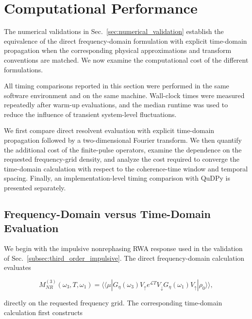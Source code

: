 \documentclass[11pt]{article}
\begin{document}
\section{Computational Performance}
\label{sec:computational_performance}

The numerical validations in Sec.~\ref{sec:numerical_validation}
establish the equivalence of the direct frequency-domain formulation
with explicit time-domain propagation when the corresponding physical
approximations and transform conventions are matched.  We now examine
the computational cost of the different formulations.

All timing comparisons reported in this section were performed in the
same software environment and on the same machine.  Wall-clock times
were measured repeatedly after warm-up evaluations, and the median
runtime was used to reduce the influence of transient system-level
fluctuations.

We first compare direct resolvent evaluation with explicit
time-domain propagation followed by a two-dimensional Fourier
transform.  We then quantify the additional cost of the finite-pulse
operators, examine the dependence on the requested frequency-grid
density, and analyze the cost required to converge the time-domain
calculation with respect to the coherence-time window and temporal
spacing.  Finally, an implementation-level timing comparison with
QuDPy is presented separately.


\subsection{Frequency-Domain versus Time-Domain Evaluation}
\label{subsec:fd_vs_td_performance}

We begin with the impulsive nonrephasing RWA response used in the
validation of Sec.~\ref{subsec:third_order_impulsive}.  The direct
frequency-domain calculation evaluates

\begin{equation}
M_{NR}^{(3)}
(\omega_3,T,\omega_1)
=
\langle\!\langle\mu|
G_\eta(\omega_3)
V_{\uparrow}
e^{\mathcal{L}T}
V_{\downarrow}
G_\eta(\omega_1)
V_{\uparrow}
|\rho_0\rangle\!\rangle ,
\end{equation}

directly on the requested frequency grid.  The corresponding
time-domain calculation first constructs
\end{document}
